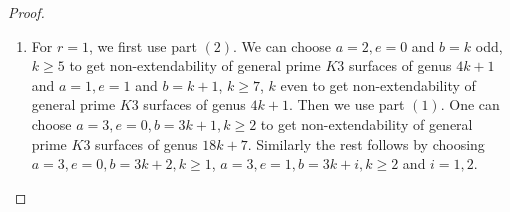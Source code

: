 \documentclass[11pt,twoside]{amsart}
\theoremstyle{plain}
\numberwithin{equation}{section}
\theoremstyle{definition}
\begin{document}
\begin{proof}
\begin{enumerate}
        \item[(5)] For $r = 1$, we first use part $(2)$. We can choose $a = 2, e = 0$  and $b = k$ odd, $k \geq 5$ to get non-extendability of general prime $K3$ surfaces of genus $4k+1$ and $a = 1, e = 1$  and $b = k+1$, $k \geq 7$, $k$ even to get non-extendability of general prime $K3$ surfaces of genus $4k+1$. Then we use part $(1)$. One can choose $a = 3, e = 0, b = 3k+1, k \geq 2$ to get non-extendability of general prime $K3$ surfaces of genus $18k+7$. Similarly the rest follows by choosing $a = 3, e = 0, b = 3k+2, k \geq 1$, $a = 3, e = 1, b = 3k+i, k \geq 2$ and $i = 1,2$.
       
       
       
        

        
     
    \end{enumerate}
\end{proof}
\end{document}
